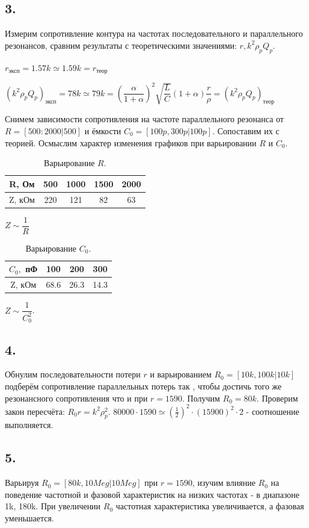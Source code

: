 \documentclass[a4paper, 12pt, twoside]{article}
\begin{document}
\subsection*{3.}
Измерим сопротивление контура на частотах последовательного и параллельного резонансов, сравним результаты с теоретическими значениями: $r, k^2\rho_p Q_p$. 

$r_{\text{эксп}} = 1.57k\simeq 1.59k = r_{\text{теор}}$

$(k^2\rho_p Q_p)_{\text{эксп}} = 78k \simeq 79k = \left (\dfrac{\alpha}{1+\alpha}\right )^2\sqrt{\dfrac{L}{C}}(1+\alpha)\dfrac{r}{\rho}  = \left(k^2\rho_p Q_p\right)_{\text{теор}}$

Снимем зависимости сопротивления на частоте параллельного резонанса от $R = [500:2000|500]$ и ёмкости $C_0 = [100p,300p|100p]$. Сопоставим их с теорией. Осмыслим характер изменения графиков при варьировании $R$ и $C_0$.

\begin{table}[H]
	\centering
	\caption{Варьирование $R$.}
	
	\begin{tabular}{|c|c|c|c|c|}
		\hline
		R, Ом  & 500 & 1000 & 1500 & 2000 \\ \hline
		Z, кОм & 220 & 121  & 82   & 63   \\ \hline
	\end{tabular}
\end{table}

$Z \sim \dfrac{1}{R}$

\begin{table}[H]
	\centering
	\caption{Варьирование $C_0$.}
	
	\begin{tabular}{|c|c|c|c|}
		\hline
		$C_0,$ пФ & 100 & 200 & 300 \\ \hline
		Z, кОм    & 68.6 &26.3   & 14.3  \\ \hline
	\end{tabular}
\end{table}

$Z \sim \dfrac{1}{C_0^2}$.

\subsection*{4.}

Обнулим последовательности потери $r$ и варьированием $R_0 = [10k, 100k|10k]$ подберём сопротивление параллельных потерь так , чтобы достичь того же резонансного сопротивления что и при $r = 1590$. Получим $R_0 = 80k$. Проверим закон пересчёта: $R_0 r = k^2 \rho_{p}^2$. $80000\cdot 1590 \simeq \left(\frac{1}{2}\right)^2\cdot (15900)^2\cdot 2$ - соотношение выполняется.

\subsection*{5.}
Варьируя $R_0 = [80k,10Meg|10Meg]$ при $r = 1590$, изучим влияние $R_0$ на поведение частотной и фазовой характеристик на низких частотах - в диапазоне 1k, 180k.
При увеличении $R_0$ частотная характеристика увеличивается, а фазовая уменьшается.
\end{document}
